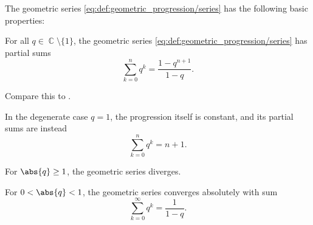 \begin{proposition}\label{thm:geometric_series_properties}
  The geometric series \eqref{eq:def:geometric_progression/series} has the following basic properties:
  \begin{thmenum}
     For all \( q \in \BbbC \setminus \{ 1 \} \), the geometric series \eqref{eq:def:geometric_progression/series} has partial sums
    \begin{equation}\label{thm:geometric_progression/partial_sum}
      \sum_{k=0}^n q^k = \frac {1 - q^{n+1}} {1 - q}.
    \end{equation}

    Compare this to .

     In the degenerate case \( q = 1 \), the progression itself is constant, and its partial sums are instead
    \begin{equation}\label{thm:geometric_progression/degenerate}
      \sum_{k=0}^n q^k = n + 1.
    \end{equation}

     For \( \abs{q} \geq 1 \), the geometric series diverges.

     For \( 0 < \abs{q} < 1 \), the geometric series converges absolutely with sum
    \begin{equation}\label{thm:geometric_progression/series_sum}
      \sum_{k=0}^\infty q^k = \frac 1 {1 - q}.
    \end{equation}
  \end{thmenum}
\end{proposition}
